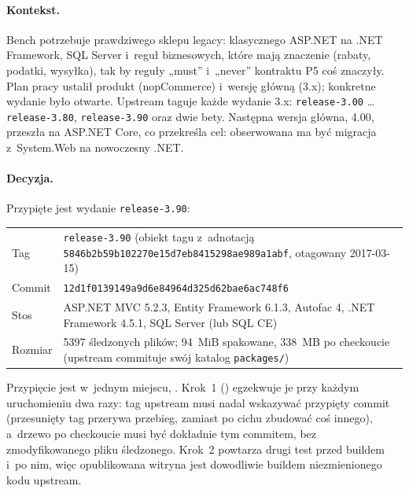 \paragraph{Kontekst.} Bench potrzebuje prawdziwego sklepu legacy: klasycznego ASP.NET na
.NET Framework, SQL Server i~reguł biznesowych, które mają znaczenie (rabaty, podatki,
wysyłka), tak by reguły „must” i~„never” kontraktu P5 coś znaczyły. Plan pracy ustalił
produkt (nopCommerce) i~wersję główną (3.x); konkretne wydanie było otwarte. Upstream
taguje każde wydanie 3.x: \texttt{release-3.00} … \texttt{release-3.80},
\texttt{release-3.90} oraz dwie bety. Następna wersja główna, 4.00, przeszła na ASP.NET
Core, co przekreśla cel: obserwowana ma być migracja z~System.Web na nowoczesny .NET.

\paragraph{Decyzja.} Przypięte jest wydanie \texttt{release-3.90}:

\begin{center}
\small
\begin{tabularx}{\linewidth}{@{}l X@{}}
\toprule
Tag & \texttt{release-3.90} (obiekt tagu z~adnotacją
  \texttt{5846b2b59b102270e15d7eb8415298ae989a1abf}, otagowany 2017-03-15) \\
Commit & \texttt{12d1f0139149a9d6e84964d325d62bae6ac748f6} \\
Stos & ASP.NET MVC 5.2.3, Entity Framework 6.1.3, Autofac 4, .NET Framework 4.5.1,
  SQL Server (lub SQL CE) \\
Rozmiar & 5397 śledzonych plików; 94~MiB spakowane, 338~MB po checkoucie (upstream
  commituje swój katalog \texttt{packages/}) \\
\bottomrule
\end{tabularx}
\end{center}

Przypięcie jest w~jednym miejscu, . Krok~1
() egzekwuje je przy każdym uruchomieniu dwa razy:
tag upstream musi nadal wskazywać przypięty commit (przesunięty tag przerywa przebieg,
zamiast po cichu zbudować coś innego), a~drzewo po checkoucie musi być dokładnie tym
commitem, bez zmodyfikowanego pliku śledzonego. Krok~2 powtarza drugi test przed buildem
i~po nim, więc opublikowana witryna jest dowodliwie buildem niezmienionego kodu upstream.


